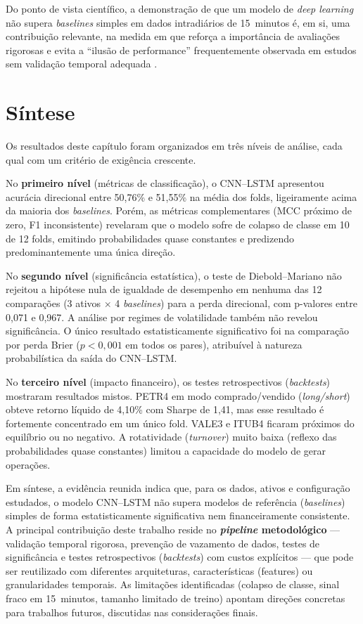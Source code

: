 Do ponto de vista científico, a demonstração de que um modelo de \emph{deep learning}
não supera \textit{baselines} simples em dados intradiários de 15~minutos é, em si, uma contribuição
relevante, na medida em que reforça a importância de avaliações rigorosas e evita a
``ilusão de performance'' frequentemente observada em estudos sem validação temporal adequada
\cite{lopezdeprado2018}.

\section{Síntese}
\label{sec:sintese}

Os resultados deste capítulo foram organizados em três níveis de análise, cada qual com
um critério de exigência crescente.

No \textbf{primeiro nível} (métricas de classificação), o CNN--LSTM apresentou acurácia
direcional entre 50,76\% e 51,55\% na média dos folds, ligeiramente acima da maioria dos
\textit{baselines}. Porém, as métricas complementares (MCC próximo de zero, F1 inconsistente)
revelaram que o modelo sofre de colapso de classe em 10 de 12 folds, emitindo probabilidades
quase constantes e predizendo predominantemente uma única direção.

No \textbf{segundo nível} (significância estatística), o teste de Diebold--Mariano não
rejeitou a hipótese nula de igualdade de desempenho em nenhuma das 12 comparações
(3 ativos $\times$ 4 \textit{baselines}) para a perda direcional, com p-valores entre 0,071 e 0,967.
A análise por regimes de volatilidade também não revelou significância.
O único resultado estatisticamente significativo foi na comparação por perda Brier
($p < 0{,}001$ em todos os pares), atribuível à natureza probabilística da saída do CNN--LSTM.

No \textbf{terceiro nível} (impacto financeiro), os testes retrospectivos (\textit{backtests}) mostraram resultados
mistos. PETR4 em modo comprado/vendido (\textit{long/short}) obteve retorno líquido de 4,10\% com Sharpe de 1,41,
mas esse resultado é fortemente concentrado em um único fold. VALE3 e ITUB4 ficaram próximos
do equilíbrio ou no negativo. A rotatividade (\textit{turnover}) muito baixa (reflexo das probabilidades quase
constantes) limitou a capacidade do modelo de gerar operações.

Em síntese, a evidência reunida indica que, para os dados, ativos e configuração estudados,
o modelo CNN--LSTM não supera modelos de referência (\textit{baselines}) simples de forma estatisticamente significativa
nem financeiramente consistente. A principal contribuição deste trabalho reside no
\textbf{\textit{pipeline} metodológico} --- validação temporal rigorosa, prevenção de vazamento de dados,
testes de significância e testes retrospectivos (\textit{backtests}) com custos explícitos --- que pode ser reutilizado
com diferentes arquiteturas, características (features) ou granularidades temporais. As limitações
identificadas (colapso de classe, sinal fraco em 15~minutos, tamanho limitado de treino)
apontam direções concretas para trabalhos futuros, discutidas nas considerações finais.
